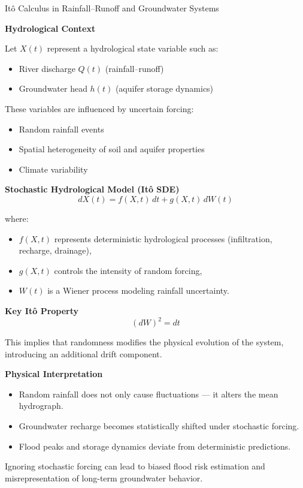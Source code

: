 \documentclass[8pt]{beamer}
\begin{document}
\begin{frame}{It\^o Calculus in Rainfall--Runoff and Groundwater Systems}

\textbf{Hydrological Context}

Let $X(t)$ represent a hydrological state variable such as:
\begin{itemize}
    \item River discharge $Q(t)$ (rainfall--runoff)
    \item Groundwater head $h(t)$ (aquifer storage dynamics)
\end{itemize}

These variables are influenced by uncertain forcing:
\begin{itemize}
    \item Random rainfall events
    \item Spatial heterogeneity of soil and aquifer properties
    \item Climate variability
\end{itemize}

\textbf{Stochastic Hydrological Model (It\^o SDE)}
\[
dX(t) = f(X,t)\,dt + g(X,t)\,dW(t)
\]

\vspace{-5pt}
where:
\begin{itemize}
    \item $f(X,t)$ represents deterministic hydrological processes (infiltration, recharge, drainage),
    \item $g(X,t)$ controls the intensity of random forcing,
    \item $W(t)$ is a Wiener process modeling rainfall uncertainty.
\end{itemize}


\textbf{Key It\^o Property}
\[
(dW)^2 = dt
\]

This implies that randomness modifies the physical evolution of the system, introducing an additional drift component.

\textbf{Physical Interpretation}
\begin{itemize}
    \item Random rainfall does not only cause fluctuations — it alters the mean hydrograph.
    \item Groundwater recharge becomes statistically shifted under stochastic forcing.
    \item Flood peaks and storage dynamics deviate from deterministic predictions.
\end{itemize}
\vspace{-1pt}

Ignoring stochastic forcing can lead to biased flood risk estimation and misrepresentation of long-term groundwater behavior.

\end{frame}
\end{document}
